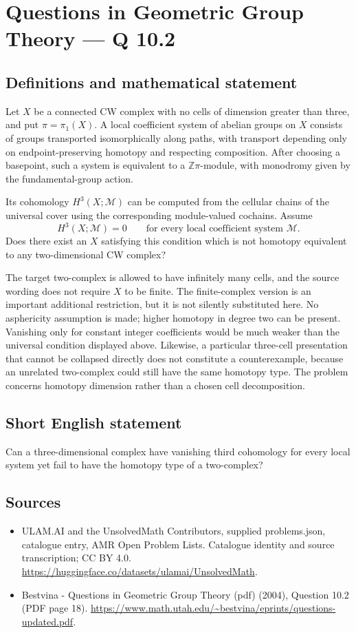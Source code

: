 \documentclass[11pt,a4paper]{article}
\begin{document}
\section*{Questions in Geometric Group Theory — Q 10.2}\label{statement}

\subsection{Definitions and mathematical statement}
Let $X$ be a connected CW complex with no cells of dimension greater than three, and put $\pi=\pi_1(X)$. A local coefficient system of abelian groups on $X$ consists of groups transported isomorphically along paths, with transport depending only on endpoint-preserving homotopy and respecting composition. After choosing a basepoint, such a system is equivalent to a $\mathbb Z\pi$-module, with monodromy given by the fundamental-group action.

Its cohomology $H^3(X;\mathcal M)$ can be computed from the cellular chains of the universal cover using the corresponding module-valued cochains. Assume
\[
 H^3(X;\mathcal M)=0
 \qquad\text{for every local coefficient system }\mathcal M.
\]
Does there exist an $X$ satisfying this condition which is not homotopy equivalent to any two-dimensional CW complex?

The target two-complex is allowed to have infinitely many cells, and the source wording does not require $X$ to be finite. The finite-complex version is an important additional restriction, but it is not silently substituted here. No asphericity assumption is made; higher homotopy in degree two can be present. Vanishing only for constant integer coefficients would be much weaker than the universal condition displayed above. Likewise, a particular three-cell presentation that cannot be collapsed directly does not constitute a counterexample, because an unrelated two-complex could still have the same homotopy type. The problem concerns homotopy dimension rather than a chosen cell decomposition.
\subsection{Short English statement}
Can a three-dimensional complex have vanishing third cohomology for every local system yet fail to have the homotopy type of a two-complex?
\subsection{Sources}
\begin{itemize}
\item[S1] ULAM.AI and the UnsolvedMath Contributors, supplied problems.json, catalogue entry, AMR Open Problem Lists. Catalogue identity and source transcription; CC BY 4.0.
\url{https://huggingface.co/datasets/ulamai/UnsolvedMath}.
\item[S2] Bestvina - Questions in Geometric Group Theory (pdf) (2004), Question 10.2 (PDF page 18). 
\url{https://www.math.utah.edu/~bestvina/eprints/questions-updated.pdf}.
\end{itemize}
\end{document}
